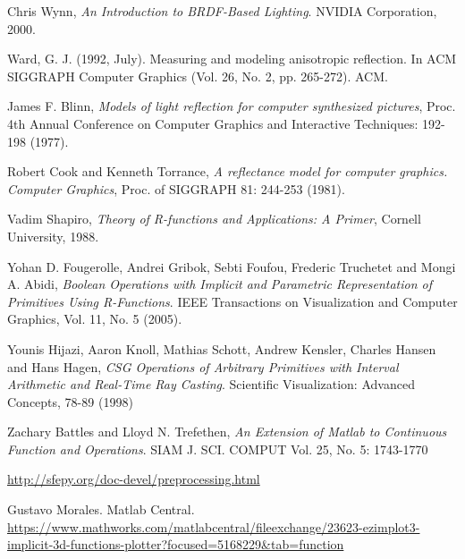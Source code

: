 \documentclass[11pt,reqno]{amsart}
\theoremstyle{definition}
\begin{document}
\begin{thebibliography}{9}

Chris Wynn,
\emph{An Introduction to BRDF-Based Lighting}.
NVIDIA Corporation, 2000.

Ward, G. J. (1992, July). Measuring and modeling anisotropic reflection. 
In ACM SIGGRAPH Computer Graphics (Vol. 26, No. 2, pp. 265-272). ACM.

James F. Blinn,  
\emph{Models of light reflection for computer synthesized pictures}, Proc. 4th
Annual Conference on Computer Graphics and Interactive Techniques: 192-198
(1977). 

Robert Cook and Kenneth Torrance,
\emph{A reflectance model for computer graphics. Computer Graphics}, Proc. of SIGGRAPH 81: 244-253 (1981).  

Vadim Shapiro,
\emph{Theory of R-functions and Applications: A Primer}, Cornell University, 1988.

Yohan D. Fougerolle, Andrei Gribok, Sebti Foufou, Frederic Truchetet and Mongi A. Abidi,
\emph{Boolean Operations with Implicit and Parametric Representation of Primitives Using R-Functions}.
IEEE Transactions on Visualization and Computer Graphics, Vol. 11, No. 5 (2005).

Younis Hijazi, Aaron Knoll, Mathias Schott, Andrew Kensler, Charles Hansen and Hans Hagen,
\emph{CSG Operations of Arbitrary Primitives with Interval Arithmetic and Real-Time Ray Casting}.
Scientific Visualization: Advanced Concepts, 78-89 (1998) 
	
 
  Zachary Battles and Lloyd N. Trefethen,
  \emph{An Extension of Matlab to Continuous Function and Operations}.
  SIAM J. SCI. COMPUT Vol. 25, No. 5: 1743-1770 
 
\url{http://sfepy.org/doc-devel/preprocessing.html}

Gustavo Morales. Matlab Central.\\
\url{https://www.mathworks.com/matlabcentral/fileexchange/23623-ezimplot3-implicit-3d-functions-plotter?focused=5168229&tab=function}
\end{thebibliography}
\fi



\end{document}
